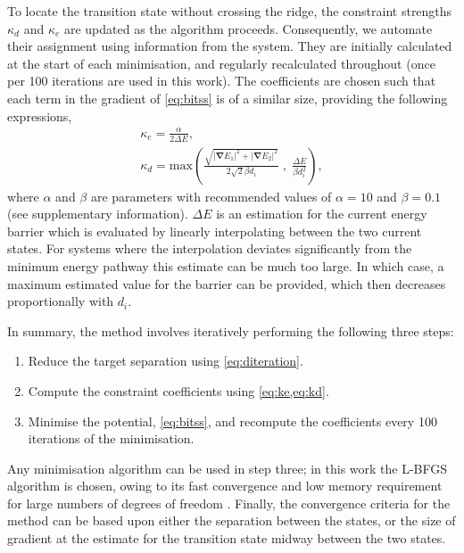 \documentclass[aps,prl,twocolumn,groupedaddress]{revtex4}
\begin{document}
\topic To locate the transition state without crossing the ridge, the constraint strengths $\kappa_d$ and $\kappa_e$ are updated as the algorithm proceeds.
Consequently, we automate their assignment using information from the system.
They are initially calculated at the start of each minimisation, and regularly recalculated throughout (once per 100 iterations are used in this work).
The coefficients are chosen such that each term in the gradient of \cref{eq:bitss} is of a similar size, providing the following expressions,
\begin{gather}
  \kappa_e = \frac {\alpha} {2 \Delta E},
  \label{eq:ke}
  \\
  \kappa_d = \text{max} \left(
    \frac {\sqrt{|\bm{\nabla} E_1|^2 + |\bm{\nabla} E_2|^2}} {2\sqrt{2} \beta d_i} \; , \;
    \frac{\Delta E}{\beta d_i^2} \right),
  \label{eq:kd}
\end{gather}
where $\alpha$ and $\beta$ are parameters with recommended values of $\alpha = 10$ and $\beta = 0.1$ (see supplementary information).
$\Delta E$ is an estimation for the current energy barrier which is evaluated by linearly interpolating between the two current states.
For systems where the interpolation deviates significantly from the minimum energy pathway this estimate can be much too large.
In which case, a maximum estimated value for the barrier can be provided, which then decreases proportionally with $d_i$.

\topic In summary, the method involves iteratively performing the following three steps:
\begin{enumerate}
  \item Reduce the target separation using \cref{eq:diteration}.
  \item Compute the constraint coefficients using \cref{eq:ke,eq:kd}.
  \item Minimise the potential, \cref{eq:bitss}, and recompute the coefficients every 100 iterations of the minimisation.
\end{enumerate}
Any minimisation algorithm can be used in step three; in this work the L-BFGS algorithm is chosen, owing to its fast convergence and low memory requirement for large numbers of degrees of freedom \cite{Liu1989}.
Finally, the convergence criteria for the method can be based upon either the separation between the states, or the size of gradient at the estimate for the transition state midway between the two states.
\end{document}
